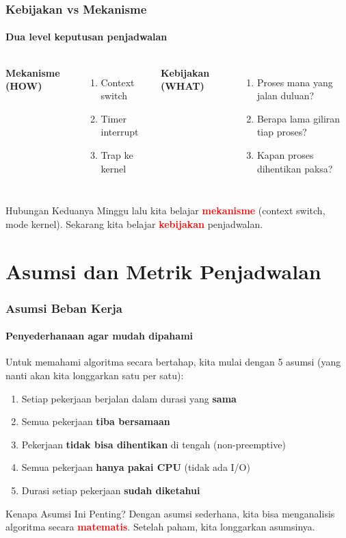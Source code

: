 \documentclass[t,aspectratio=169,xcolor=dvipsnames]{beamer}
\newcommand{\tem}[1]{\textbf{\textcolor{red}{#1}}}
\begin{document}
\begin{frame}
    \frametitle{Kebijakan vs Mekanisme}
    \framesubtitle{Dua level keputusan penjadwalan}
    \small
    \begin{columns}[T]
        \textbf{Mekanisme (HOW)}
        \begin{enumerate}
            \item Context switch
            \item Timer interrupt
            \item Trap ke kernel
        \end{enumerate}
        \textbf{Kebijakan (WHAT)}
        \begin{enumerate}
            \item Proses mana yang jalan duluan?
            \item Berapa lama giliran tiap proses?
            \item Kapan proses dihentikan paksa?
        \end{enumerate}
    \end{columns}
    \begin{block}{Hubungan Keduanya}
        Minggu lalu kita belajar \tem{mekanisme} (context switch, mode kernel). Sekarang kita belajar \tem{kebijakan} penjadwalan.
    \end{block}
\end{frame}

\section{Asumsi dan Metrik Penjadwalan}

\begin{frame}
    \frametitle{Asumsi Beban Kerja}
    \framesubtitle{Penyederhanaan agar mudah dipahami}
    \small
    Untuk memahami algoritma secara bertahap, kita mulai dengan 5 asumsi (yang nanti akan kita longgarkan satu per satu):
    \begin{enumerate}
        \item Setiap pekerjaan berjalan dalam durasi yang \textbf{sama}
        \item Semua pekerjaan \textbf{tiba bersamaan}
        \item Pekerjaan \textbf{tidak bisa dihentikan} di tengah (non-preemptive)
        \item Semua pekerjaan \textbf{hanya pakai CPU} (tidak ada I/O)
        \item Durasi setiap pekerjaan \textbf{sudah diketahui}
    \end{enumerate}
    \begin{exampleblock}{Kenapa Asumsi Ini Penting?}
        Dengan asumsi sederhana, kita bisa menganalisis algoritma secara \tem{matematis}. Setelah paham, kita longgarkan asumsinya.
    \end{exampleblock}
\end{frame}
\end{document}
